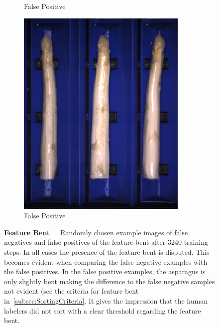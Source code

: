 \begin{figure}[!htb]
\begin{subfigure}{0.3\textwidth}
		\vspace{-5pt}
		\caption{False Positive}
	\end{subfigure}
	\begin{subfigure}{0.3\textwidth}
		\includegraphics[width=0.9\linewidth]{Figures/chapter04/bent_falsepositive_03.png}
		\vspace{-5pt}
		\caption{False Positive}
	\end{subfigure}
	\vspace{-5pt}
    \caption[Single-Label CNN Example Images Feature Bent]{\textbf{Feature Bent}~~~Randomly chosen example images of false negatives and false positives of the feature bent after 3240 training steps. In all cases the presence of the feature bent is disputed. This becomes evident when comparing the false negative examples with the false positives. In the false positive examples, the asparagus is only slightly bent making the difference to the false negative samples not evident (see the criteria for feature bent in~\autoref{subsec:SortingCriteria}. It gives the impression that the human labelers did not sort with a clear threshold regarding the feature bent.}
    \label{fig:ExampleImagesBent}
\end{figure}

